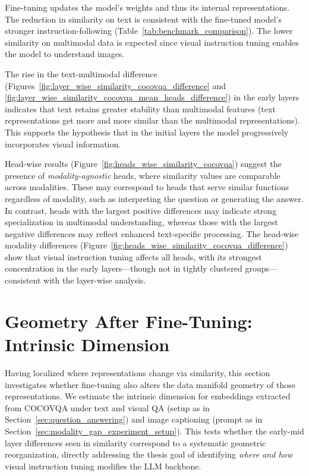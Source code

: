 Fine-tuning updates the model's weights and thus its internal representations. The reduction in similarity on text is consistent with the fine-tuned model's stronger instruction-following (Table~\ref{tab:benchmark_comparison}). The lower similarity on multimodal data is expected since visual instruction tuning enables the model to understand images.

The rise in the text-multimodal difference (Figures~\ref{fig:layer_wise_similarity_cocovqa_difference} and \ref{fig:layer_wise_similarity_cocovqa_mean_heads_difference}) in the early layers indicates that text retains greater stability than multimodal features (text representations get more and more similar than the multimodal representations). This supports the hypothesis that in the initial layers the model progressively incorporates visual information.

Head-wise results (Figure~\ref{fig:heads_wise_similarity_cocovqa}) suggest the presence of \emph{modality-agnostic} heads, where similarity values are comparable across modalities. These may correspond to heads that serve similar functions regardless of modality, such as interpreting the question or generating the answer. In contrast, heads with the largest positive differences may indicate strong specialization in multimodal understanding, whereas those with the largest negative differences may reflect enhanced text-specific processing. The head-wise modality differences (Figure~\ref{fig:heads_wise_similarity_cocovqa_difference}) show that visual instruction tuning affects all heads, with its strongest concentration in the early layers---though not in tightly clustered groups---consistent with the layer-wise analysis.

\section{Geometry After Fine-Tuning: Intrinsic Dimension}\label{sec:geometric_reorganization}

Having localized where representations change via similarity, this section investigates whether fine-tuning also alters the data manifold geometry of those representations. We estimate the intrinsic dimension for embeddings extracted from COCOVQA under text and visual QA (setup as in Section~\ref{sec:question_answering}) and image captioning (prompt as in Section~\ref{sec:modality_gap_experiment_setup}). This tests whether the early-mid layer differences seen in similarity correspond to a systematic geometric reorganization, directly addressing the thesis goal of identifying \emph{where and how} visual instruction tuning modifies the LLM backbone.

